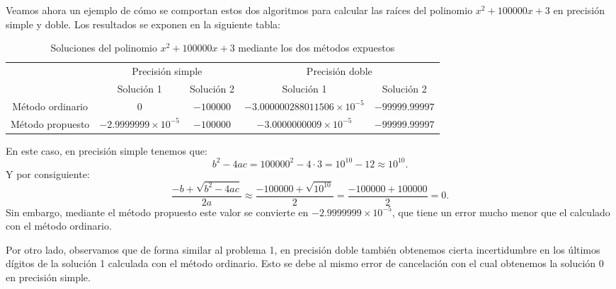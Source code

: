 \documentclass[a4paper]{article}
\begin{document}
Veamos ahora un ejemplo de cómo se comportan estos dos algoritmos para calcular las raíces del polinomio $x^2+100000x+3$ en precisión simple y doble. Los resultados se exponen en la siguiente tabla:\par
\begin{table}[ht]
	\centering
	\begin{tabular}{|c|c|c||c|c|}
	    \hline
	    & \multicolumn{2}{c||}{Precisión simple} & \multicolumn{2}{c|}{Precisión doble}\\
		\cline{2-5} 
		& Solución 1 & Solución 2 & Solución 1 & Solución 2\\
		\hline
		Método ordinario & $0$ & $-100000$ & $-3.000000288011506\times10^{-5}$ & $-99999.99997$ \\
		\hline
		Método propuesto &  $-2.9999999\times10^{-5}$ & $-100000$ & $-3.0000000009\times10^{-5}$ & $-99999.99997$\\
		\hline
	\end{tabular}
		\caption{Soluciones del polinomio $x^2+100000x+3$ mediante los dos métodos expuestos}
		\label{tab:10}
	\end{table}
En este caso, en precisión simple tenemos que: $$b^2-4ac=100000^2-4\cdot 3=10^{10}-12\approx10^{10}.$$
Y por consiguiente: $$\frac{-b+\sqrt{b^2-4ac}}{2a}\approx\frac{-100000+\sqrt{10^{10}}}{2}=\frac{-100000+100000}{2}=0.$$ Sin embargo, mediante el método propuesto este valor se convierte en $-2.9999999\times 10^{-5}$, que tiene un error mucho menor que el calculado con el método ordinario.\par Por otro lado, observamos que de forma similar al problema 1, en precisión doble también obtenemos cierta incertidumbre en los últimos dígitos de la solución 1 calculada con el método ordinario. Esto se debe al mismo error de cancelación con el cual obtenemos la solución 0 en precisión simple.
\newpage
\end{document}
